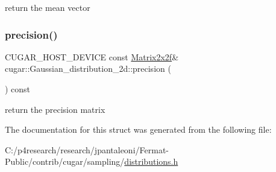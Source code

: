 return the mean vector \mbox{\label{structcugar_1_1_gaussian__distribution__2d_a8791393607fd2cd1a35e61a3656216e5}} 
\subsubsection{\texorpdfstring{precision()}{precision()}}
{\footnotesize\ttfamily C\+U\+G\+A\+R\+\_\+\+H\+O\+S\+T\+\_\+\+D\+E\+V\+I\+CE const \hyperlink{structcugar_1_1_matrix}{Matrix2x2f}\& cugar\+::\+Gaussian\+\_\+distribution\+\_\+2d\+::precision (\begin{DoxyParamCaption}{ }\end{DoxyParamCaption}) const\hspace{0.3cm}{\ttfamily [inline]}}

return the precision matrix 

The documentation for this struct was generated from the following file\+:\begin{DoxyCompactItemize}
\item 
C\+:/p4research/research/jpantaleoni/\+Fermat-\/\+Public/contrib/cugar/sampling/\hyperlink{distributions_8h}{distributions.\+h}\end{DoxyCompactItemize}
